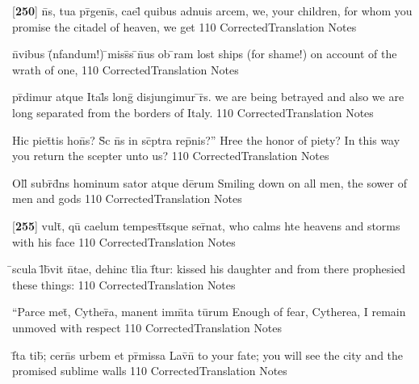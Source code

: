\documentclass[]{book}
\begin{document}
\latline
  {[\textbf{250}] n\={}s, tua pr\={}geni\={}s, cael\={\macron {\i}} quibus adnuis arcem,}
  { we, your children, for whom you promise the citadel of heaven, we get  }
  {110}
  { CorrectedTranslation }
  { Notes }


\latline
  {n\={}vibus (\={\macron {\i}}nfandum!) \={}miss\={\macron {\i}}s \={}n\={\macron {\i}}us ob \={\macron {\i}}ram}
  { lost ships (for shame!) on account of the wrath of one,  }
  {110}
  { CorrectedTranslation }
  { Notes }


\latline
  {pr\={}dimur atque Ital\={\macron {\i}}s long\={} disjungimur \={}r\={\macron {\i}}s.}
  { we are being betrayed and also we are long separated from the borders of Italy. }
  {110}
  { CorrectedTranslation }
  { Notes }


\latline
  {Hic piet\={}tis hon\={}s?  S\={\macron {\i}}c n\={}s in sc\={}ptra rep\={}nis?''}
  { Hree the honor of piety?  In this way you return the scepter unto us? }
  {110}
  { CorrectedTranslation }
  { Notes }


\latline
  {Oll\={\macron {\i}} subr\={\macron {\i}}d\={}ns hominum sator atque de\={}rum}
  { Smiling down on all men, the sower of men and gods }
  {110}
  { CorrectedTranslation }
  { Notes }


\latline
  {[\textbf{255}] vult\={}, qu\={} caelum tempest\={}t\={}sque ser\={}nat,}
  { who calms hte heavens and storms with his face }
  {110}
  { CorrectedTranslation }
  { Notes }


\latline
  {\={}scula l\={\macron {\i}}b\={}vit n\={}tae, dehinc t\={}lia f\={}tur:}
  { kissed his daughter and from there prophesied these things: }
  {110}
  { CorrectedTranslation }
  { Notes }


\latline
  {``Parce met\={}, Cyther\={}a, manent imm\={}ta tu\={}rum}
  { Enough of fear, Cytherea, I remain unmoved with respect }
  {110}
  { CorrectedTranslation }
  { Notes }


\latline
  {f\={}ta tib\={\macron {\i}}; cern\={}s urbem et pr\={}missa Lav\={\macron {\i}}n\={\macron {\i}}}
  { to your fate; you will see the city and the promised sublime walls }
  {110}
  { CorrectedTranslation }
  { Notes }
\end{document}
